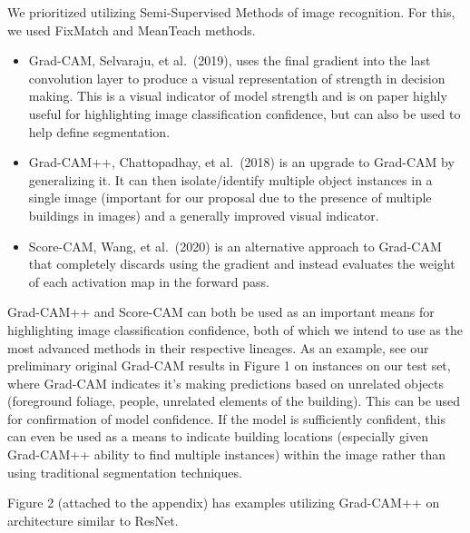 \documentclass{article}
\begin{document}
We prioritized utilizing Semi-Supervised Methods of image recognition. For this, we used FixMatch and MeanTeach methods. 


\begin{itemize} %
    \item \citet{selvaraju} Grad-CAM, Selvaraju, et al.\ (2019), uses the final gradient into the last convolution layer to produce a visual representation of strength in decision making. This is a visual indicator of model strength and is on paper highly useful for highlighting image classification confidence, but can also be used to help define segmentation. 
    \item Grad-CAM++, Chattopadhay, et al.\ (2018) is an upgrade to Grad-CAM by generalizing it. It can then isolate/identify multiple object instances in a single image (important for our proposal due to the presence of multiple buildings in images) and a generally improved visual indicator. 
    \item Score-CAM, Wang, et al.\ (2020) is an alternative approach to Grad-CAM that completely discards using the gradient and instead evaluates the weight of each activation map in the forward pass. 
\end{itemize}

Grad-CAM++ and Score-CAM can both be used as an important means for highlighting image classification confidence, both of which we intend to use as the most advanced methods in their respective lineages. As an example, see our preliminary original Grad-CAM results in Figure 1 on instances on our test set, where Grad-CAM indicates it's making predictions based on unrelated objects (foreground foliage, people, unrelated elements of the building). This can be used for confirmation of model confidence. If the model is sufficiently confident, this can even be used as a means to indicate building locations (especially given Grad-CAM++ ability to find multiple instances) within the image rather than using traditional segmentation techniques.

Figure 2 (attached to the appendix) has examples utilizing Grad-CAM++ on architecture similar to ResNet.
\end{document}
